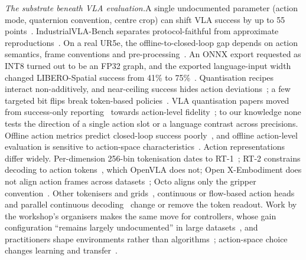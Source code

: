 \documentclass[conference]{IEEEtran}
\newcommand{\head}[1]{\textit{#1}\hspace{0.4em}}
\begin{document}
\head{The substrate beneath VLA evaluation.}A single undocumented parameter (action mode, quaternion convention, centre crop) can shift VLA success by up to 55 points~\cite{choi2026vlaeval}. IndustrialVLA-Bench separates protocol-faithful from approximate reproductions~\cite{wang2026industrialvla}. On a real UR5e, the offline-to-closed-loop gap depends on action semantics, frame conventions and pre-processing~\cite{hochedel2026insights}. An ONNX export requested as INT8 turned out to be an FP32 graph, and the exported language-input width changed LIBERO-Spatial success from 41\% to 75\%~\cite{islam2026deployment}. Quantisation recipes interact non-additively, and near-ceiling success hides action deviations~\cite{xu2026vlaquantbench}; a few targeted bit flips break token-based policies~\cite{gao2026bitflip}. VLA quantisation papers moved from success-only reporting~\cite{wang2025bitvla,zhang2026quantvla} towards action-level fidelity~\cite{park2024quantization,park2025saliency,xu2026qvla,yan2026hbvla,zheng2026dyqvla}; to our knowledge none tests the direction of a single action slot or a language contrast across precisions. Offline action metrics predict closed-loop success poorly~\cite{li2024evaluating,wang2026reali}, and offline action-level evaluation is sensitive to action-space characteristics~\cite{guruprasad2024benchmarking}. Action representations differ widely. Per-dimension 256-bin tokenisation dates to RT-1~\cite{brohan2023rt1}; RT-2 constrains decoding to action tokens~\cite{brohan2023rt2}, which OpenVLA does not; Open X-Embodiment does not align action frames across datasets~\cite{oneill2024open}; Octo aligns only the gripper convention~\cite{ghosh2024octo}. Other tokenisers and grids~\cite{pertsch2025fast,qu2025spatialvla,wang2025vqvla,liu2026oat,goyal2025vla0}, continuous or flow-based action heads~\cite{li2024cogact,black2025pi0,black2025pi05} and parallel continuous decoding~\cite{kim2025finetuning} change or remove the token readout. Work by the workshop's organisers makes the same move for controllers, whose gain configuration ``remains largely undocumented'' in large datasets~\cite{bronars2026tune}, and practitioners shape environments rather than algorithms~\cite{park2024automatic}; action-space choice changes learning and transfer~\cite{aljalbout2024role,martinmartin2019variable}.
\end{document}
